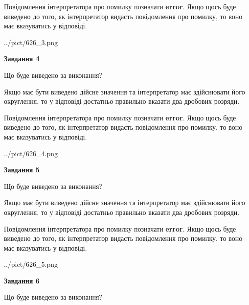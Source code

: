 \documentclass[12pt, ukrainian]{article}
\begin{document}
{\begin {Large}
Повідомлення інтерпретатора про помилку позначати \textbf{error}.
Якщо щось буде виведено до того, як інтерпретатор видасть повідомлення про помилку, 
то воно має вказуватись у відповіді. \par

\begin{center}
	{../pict/626_3.png}
\end{center}
\newpage

{\begin {center}\textbf{Завдання 4}\end {center}}\par
Що буде виведено за виконання? \par

Якщо має бути виведено дійсне значення та інтерпретатор має здійснювати його округлення, 
то у відповіді достатньо правильно вказати два дробових розряди.

Повідомлення інтерпретатора про помилку позначати \textbf{error}.
Якщо щось буде виведено до того, як інтерпретатор видасть повідомлення про помилку, 
то воно має вказуватись у відповіді. \par

\begin{center}
	{../pict/626_4.png}
\end{center}
\newpage

{\begin {center}\textbf{Завдання 5}\end {center}}\par
Що буде виведено за виконання? \par

Якщо має бути виведено дійсне значення та інтерпретатор має здійснювати його округлення, 
то у відповіді достатньо правильно вказати два дробових розряди.

Повідомлення інтерпретатора про помилку позначати \textbf{error}.
Якщо щось буде виведено до того, як інтерпретатор видасть повідомлення про помилку, 
то воно має вказуватись у відповіді. \par

\begin{center}
	{../pict/626_5.png}
\end{center}
\newpage

{\begin {center}\textbf{Завдання 6}\end {center}}\par
Що буде виведено за виконання? \par


\end{Large}}
\end{document}
